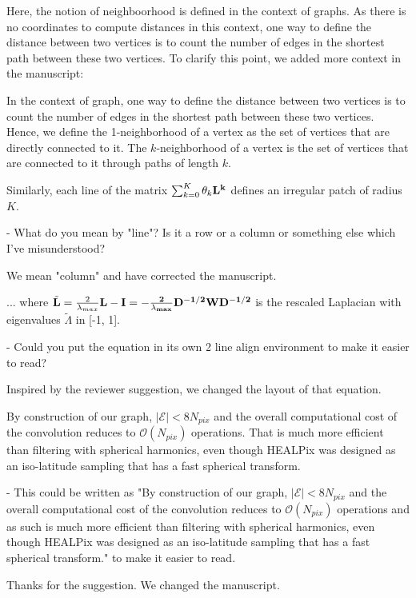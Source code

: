 \documentclass[12pt,a4paper]{article}
\newcommand{\1}{\b{1}}              %
\newcommand{\0}{\b{0}}              %
\begin{document}
Here, the notion of neighboorhood is defined in the context of graphs. As there is no coordinates to compute distances in this context, one way to define the distance between two vertices is to count the number of edges in the shortest path between these two vertices. To clarify this point, we added more context in the manuscript:

\begin{mdframed}[style=manuscript]
In the context of graph, one way to define the distance between two vertices is to count the number of edges in the shortest path between these two vertices. Hence, we define the 1-neighborhood of a vertex as the set of vertices that are directly connected to it. The $k$-neighborhood of a vertex is the set of vertices that are connected to it through paths of length $k$.
\end{mdframed}


\begin{mdframed}[style=comment]
Similarly, each line of the matrix $\sum_{k=0}^K\theta_k\bf{L}^k$ defines an irregular patch of radius $K$.

 - What do you mean by "line"? Is it a row or a column or something else which I've misunderstood?
\end{mdframed}
We mean "column" and have corrected the manuscript.

\begin{mdframed}[style=comment]
... where $\tilde{\bf{L}}= \frac{2}{\lambda_{max}}\bf{L}-\bf{I}=-\frac{2}{\lambda_{max}}\bf{D}^{-1/2}\bf{W}\bf{D}^{-1/2}$ is the rescaled Laplacian with eigenvalues $\tilde{\Lambda}$ in [-1, 1].

 - Could you put the equation in its own 2 line align environment to make it easier to read?
\end{mdframed}
Inspired by the reviewer suggestion, we changed the layout of that equation.

\begin{mdframed}[style=comment]
By construction of our graph, $|\mathcal{E}| < 8N_{pix}$ and the overall computational cost of the convolution reduces to $\mathcal{O}(N_{pix})$ operations. That is much more efficient than filtering with spherical harmonics, even though HEALPix was designed as an iso-latitude sampling that has a fast spherical transform.

- This could be written as "By construction of our graph, $|\mathcal{E}| < 8N_{pix}$ and the overall computational cost of the convolution reduces to $\mathcal{O}(N_{pix})$ operations and as such is much more efficient than filtering with spherical harmonics, even though HEALPix was designed as an iso-latitude sampling that has a fast spherical transform." to make it easier to read.
\end{mdframed}
Thanks for the suggestion. We changed the manuscript.
\end{document}
